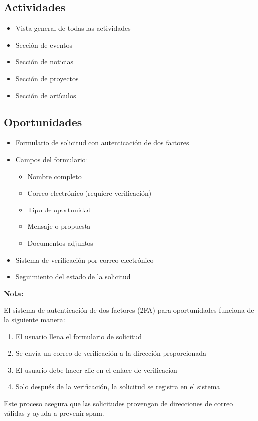 \documentclass[12pt,letterpaper]{report}
\newenvironment{note}
    {\begin{mdframed}[linecolor=note-blue,linewidth=2pt,backgroundcolor=note-blue!10]
    \textbf{Nota:}\par}
    {\end{mdframed}}
\begin{document}
\subsection{Actividades}
\begin{itemize}
    \item Vista general de todas las actividades
    \item Sección de eventos
    \item Sección de noticias
    \item Sección de proyectos
    \item Sección de artículos
\end{itemize}

\subsection{Oportunidades}
\begin{itemize}
    \item Formulario de solicitud con autenticación de dos factores
    \item Campos del formulario:
        \begin{itemize}
            \item Nombre completo
            \item Correo electrónico (requiere verificación)
            \item Tipo de oportunidad
            \item Mensaje o propuesta
            \item Documentos adjuntos
        \end{itemize}
    \item Sistema de verificación por correo electrónico
    \item Seguimiento del estado de la solicitud
\end{itemize}

\begin{note}
El sistema de autenticación de dos factores (2FA) para oportunidades funciona de la siguiente manera:
\begin{enumerate}
    \item El usuario llena el formulario de solicitud
    \item Se envía un correo de verificación a la dirección proporcionada
    \item El usuario debe hacer clic en el enlace de verificación
    \item Solo después de la verificación, la solicitud se registra en el sistema
\end{enumerate}
Este proceso asegura que las solicitudes provengan de direcciones de correo válidas y ayuda a prevenir spam.
\end{note}
\end{document}
